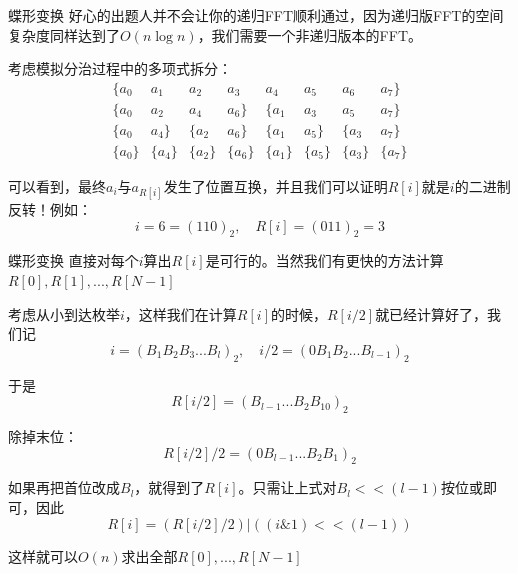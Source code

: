 \documentclass{beamer}
\begin{document}
\begin{frame}{蝶形变换}
    好心的出题人并不会让你的递归FFT顺利通过，因为递归版FFT的空间复杂度同样达到了$O(n\log n)$，我们需要一个非递归版本的FFT。

    考虑模拟分治过程中的多项式拆分：
    \begin{equation*}
        \begin{array}{cccccccc}
            \{a_0 & a_1 & a_2 & a_3 & a_4 & a_5 & a_6 & a_7\} \\
            \{a_0 & a_2 & a_4 & a_6\} & \{a_1 & a_3 & a_5 & a_7\} \\
            \{a_0 & a_4\} & \{a_2 & a_6\} & \{a_1 & a_5\} & \{a_3 & a_7\}\\
            \{a_0\} & \{a_4\} & \{a_2\} & \{a_6\} & \{a_1\} & \{a_5\} & \{a_3\} & \{a_7\}
        \end{array}
    \end{equation*}

    \pause
    可以看到，最终$a_i$与$a_{R[i]}$发生了位置互换，并且我们可以证明$R[i]$就是$i$的二进制反转！例如：
    \begin{equation*}
        i=6=(110)_2,\quad R[i]=(011)_2=3
    \end{equation*}
\end{frame}

\begin{frame}{蝶形变换}
    直接对每个$i$算出$R[i]$是可行的。当然我们有更快的方法计算$R[0],R[1],...,R[N-1]$

    \pause
    考虑从小到达枚举$i$，这样我们在计算$R[i]$的时候，$R[i/2]$就已经计算好了，我们记
    \begin{equation*}
        i=(B_1B_2B_3...B_l)_2,\quad i/2=(0B_1B_2...B_{l-1})_2
    \end{equation*}

    于是
    \begin{equation*}
        R[i/2]=(B_{l-1}...B_2B_10)_2
    \end{equation*}

    \pause
    除掉末位：
    \begin{equation*}
        R[i/2]/2=(0B_{l-1}...B_2B_1)_2
    \end{equation*}

    \pause
    如果再把首位改成$B_l$，就得到了$R[i]$。只需让上式对$B_l<<(l-1)$按位或即可，因此
    \begin{equation*}
        R[i]=(R[i/2]/2)|((i\&1)<<(l-1))
    \end{equation*}

    这样就可以$O(n)$求出全部$R[0],...,R[N-1]$
\end{frame}
\end{document}
